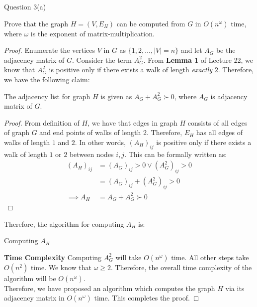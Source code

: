 \begin{solution}{Question 3(a)}\label{ques:3a}
    \begin{question}
        Prove that the graph $H = (V, E_H)$ can be computed from $G$ in $O(n^\omega)$ time, where $\omega$ is the exponent of matrix-multiplication.
    \end{question}
    \tcblower{}
    \begin{proof}[Proof]
      Enumerate the vertices $V$ in $G$ as $\{1, 2, \ldots, |V| = n\}$ and let $A_G$ be the adjacency matrix of $G$. Consider the term $A_G^2$. From \textbf{Lemma 1} of Lecture 22, we know that $A_G^2$ is positive only if there exists a walk of length \textit{exactly} $2$. Therefore, we have the following claim:
      \begin{claim}
        The adjacency list for graph $H$ is given as $A_G+A_G^2 \succ 0$, where $A_G$ is adjacency matrix of $G$.
      \end{claim}
      \begin{proof}
        From definition of $H$, we have that edges in graph $H$ consists of all edges of graph $G$ and end points of walks of length $2$. Therefore, $E_H$ has all edges of walks of length $1$ and $2$. In other words, ${(A_H)}_{ij}$ is positive only if there exists a walk of length $1$ or $2$ between nodes $i, j$. This can be formally written as:
        \begin{equation}
          \begin{split}
            {(A_H)}_{ij} &= {(A_G)}_{ij} > 0 \vee {(A_G^2)}_{ij} > 0\\
                         &= {(A_G)}_{ij} + {(A_G^2)}_{ij} > 0\\
            \implies A_H &= A_G+A_G^2 \succ 0
          \end{split}
        \end{equation}
      \end{proof}
      Therefore, the algorithm for computing $A_H$ is:
      \begin{algorithm}[H]
        \caption{Computing $A_H$}
        \begin{algorithmic}[1]
              \Else{}
              \EndIf{}
            \EndFor{}
          \EndProcedure{}
        \end{algorithmic}
      \end{algorithm}
      \textbf{Time Complexity} Computing $A_G^2$ will take $O(n^\omega)$ time. All other steps take $O(n^2)$ time. We know that $\omega \geq 2$. Therefore, the overall time complexity of the algorithm will be $O(n^\omega)$.\\
      Therefore, we have proposed an algorithm which computes the graph $H$ via its adjacency matrix in $O(n^\omega)$ time. This completes the proof.
    \end{proof}
\end{solution}
